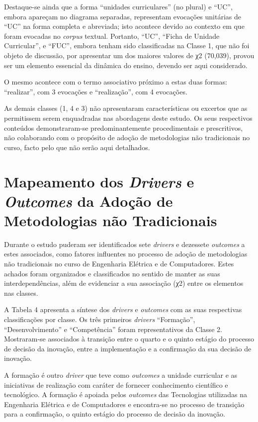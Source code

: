 \documentclass{textolivre-html}
\begin{document}
Destaque-se ainda que a forma “unidades curriculares” (no plural) e “UC”, embora apareçam no diagrama separadas, representam evocações unitárias de “UC” na forma completa e abreviada; isto acontece devido ao contexto em que foram evocadas no \textit{corpus} textual. Portanto, “UC”, “Ficha de Unidade Curricular”, e “FUC”, embora tenham sido classificadas na Classe 1, que não foi objeto de discussão, por apresentar um dos maiores valores de χ2 (70,039), provou ser um elemento essencial da dinâmica do ensino, devendo ser aqui considerado.

O mesmo acontece com o termo associativo próximo a estas duas formas: “realizar”, com 3 evocações e “realização”, com 4 evocações.

As demais classes (1, 4 e 3) não apresentaram características ou excertos que as permitissem serem enquadradas nas abordagens deste estudo. Os seus respectivos conteúdos demonstraram-se predominantemente procedimentais e prescritivos, não colaborando com o propósito de adoção de metodologias não tradicionais no curso, facto pelo que não serão aqui detalhados.

\section{Mapeamento dos \textit{Drivers} e \textit{Outcomes} da Adoção de Metodologias não Tradicionais}\label{sec-mapeamento}
Durante o estudo puderam ser identificados sete \textit{drivers} e dezessete \textit{outcomes} a estes associados, como fatores influentes no processo de adoção de metodologias não tradicionais no curso de Engenharia Elétrica e de Computadores. Estes achados foram organizados e classificados no sentido de manter as suas interdependências, além de evidenciar a sua associação (χ2) entre os elementos nas classes.  

A Tabela 4 apresenta a síntese dos \textit{drivers} e \textit{outcomes} com as suas respectivas classificações por classe. Os três primeiros \textit{drivers} “Formação”, “Desenvolvimento” e “Competência” foram representativos da Classe 2. Mostraram-se associados à transição entre o quarto e o quinto estágio do processo de decisão da inovação, entre a implementação e a confirmação da sua decisão de inovação.

A formação é outro \textit{driver} que teve como \textit{outcomes} a unidade curricular e as iniciativas de realização com caráter de fornecer conhecimento científico e tecnológico. A formação é apoiada pelos \textit{outcomes} das Tecnologias utilizadas na Engenharia Elétrica e de Computadores e encontra-se no processo de transição para a confirmação, o quinto estágio do processo de decisão da inovação.
\end{document}
